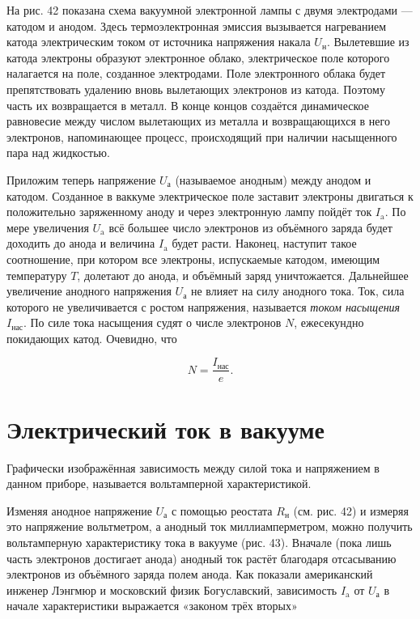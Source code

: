 \documentclass[a4paper,10pt]{book}
\begin{document}
На рис. 42 показана схема вакуумной электронной лампы с двумя электродами — катодом и анодом. Здесь термоэлектронная эмиссия вызывается нагреванием катода электрическим током от источника напряжения накала $U_\text{н}$. Вылетевшие из катода электроны образуют электронное облако, электрическое поле которого налагается на поле, созданное электродами. Поле электронного облака будет препятствовать удалению вновь вылетающих электронов из катода. Поэтому часть их возвращается в металл. В конце концов создаётся динамическое равновесие между числом вылетающих из металла и возвращающихся в него электронов, напоминающее процесс, происходящий при наличии насыщенного пара над жидкостью.

Приложим теперь напряжение $U_\text{а}$ (называемое анодным) между анодом и катодом. Созданное в ваккуме электрическое поле заставит электроны двигаться к положительно заряженному аноду и через электронную лампу пойдёт ток $I_\text{a}$. По мере увеличения $U_\text{a}$ всё большее число электронов из объёмного заряда будет доходить до анода и величина $I_\text{a}$ будет расти. Наконец, наступит такое соотношение, при котором все электроны, испускаемые катодом, имеющим температуру $T$, долетают до анода, и объёмный заряд уничтожается. Дальнейшее увеличение анодного напряжения $U_\text{а}$ не влияет на силу анодного тока. Ток, сила которого не увеличивается с ростом напряжения, называется \emph{током насыщения} $I_\text{нас}$. По силе тока насыщения судят о числе электронов $N$, ежесекундно покидающих катод. Очевидно, что


\begin{equation}
N = \frac{I_\text{нас}}{e}.\nonumber
\end{equation}

\section{Электрический ток в вакууме}
Графически изображённая зависимость между силой тока и напряжением в данном приборе, называется вольтамперной характеристикой.

Изменяя анодное напряжение $U_\text{а}$ с помощью реостата $R_\text{н}$ (см. рис. 42) и измеряя это напряжение вольтметром, а анодный ток миллиамперметром, можно получить вольтамперную характеристику тока в вакууме (рис. 43). Вначале (пока лишь часть электронов достигает анода) анодный ток растёт благодаря отсасыванию электронов из объёмного заряда полем анода. Как показали американский инженер Лэнгмюр и московский физик Богуславский, зависимость $I_\text{a}$ от $U_\text{а}$ в начале характеристики выражается «законом трёх вторых»
\end{document}
